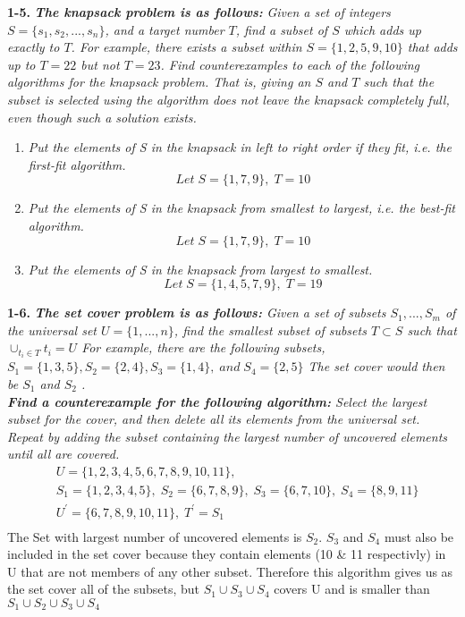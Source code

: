 %
%
%
{\raggedleft{}\textbf{1-5.} \emph{\textbf{The knapsack problem is as follows:}} \emph{Given a set of integers $S = \{s_{1}, s_{2},...,s_{n}\}$,
and a target number $T$, find a subset of $S$ which adds up exactly to $T$. For example,
there exists a subset within $S = \{1, 2, 5, 9, 10\}$ that adds up to $T = 22$ but not
$T = 23$.
Find counterexamples to each of the following algorithms for the knapsack problem.
That is, giving an $S$ and $T$ such that the subset is selected using the algorithm does
not leave the knapsack completely full, even though such a solution exists.}}
\begin{enumerate}[label=(\alph*)]
\itemsep1pt\parskip0pt
	\item{\emph{Put the elements of S in the knapsack in left to right order if they fit, i.e. the first-fit algorithm.} \\
		\textcolor{answer}{
		 $$Let\;  S = \{1,7,9\}, \; T = 10$$
		}
	}
	\item{\emph{Put the elements of S in the knapsack from smallest to largest, i.e. the best-fit algorithm.} \\
		\textcolor{answer}{
		$$Let\;  S = \{1,7,9\}, \; T = 10$$
		}
	}
	\item{\emph{Put the elements of S in the knapsack from largest to smallest.} \\
		\textcolor{answer}{
		$$Let\;  S = \{1,4,5,7,9\}, \; T = 19$$
		}
	}
\end{enumerate}
%
%
%
\textbf{1-6.} \emph{\textbf{The set cover problem is as follows: } Given a set of subsets $S_{1}, ..., S_{m}$ of the universal set 
$U = \{1, ..., n\}$, 
find the smallest subset of subsets 
$T \subset S$ 
such that  
$\cup_{t_{i} \in T}t_{i} = U$ For example, there are the following subsets, $S_{1} = \{1, 3, 5\}, S_{2} = \{2, 4\}, S_{3} = \{1, 4\}, \; and \; S_{4} = \{2, 5\}$ The set cover would then be $S_{1}$ and $S_{2}$ . } \\
\emph{\textbf{Find a counterexample for the following algorithm:} Select the largest subset for the cover, and then delete all its elements from the universal set. Repeat by adding the subset containing the largest number of uncovered elements until all are covered.}
{\color{answer}{}
\begin{align*}
	&U = \{1,2,3,4,5,6,7,8,9,10,11\}, \\
	&S_{1} = \{1,2,3,4,5\}, \; S_{2} = \{6,7,8,9\}, \; S_{3} = \{6,7,10\}, \; S_{4} = \{8,9,11\} \\
	&U^{'} = \{6,7,8,9,10,11\}, \; T^{'} = S_{1} \\
\end{align*}
The Set with largest number of uncovered elements is $S_{2}$. $S_{3}$ and $S_{4}$ must also be included in the set cover because they contain elements (10 \& 11 respectivly)
in U that are not members of any other subset. Therefore this algorithm gives us as the set cover all of the subsets, but $S_{1} \cup S_{3} \cup S_{4}$ covers U and is smaller
than $S_{1} \cup S_{2} \cup S_{3} \cup S_{4}$}

